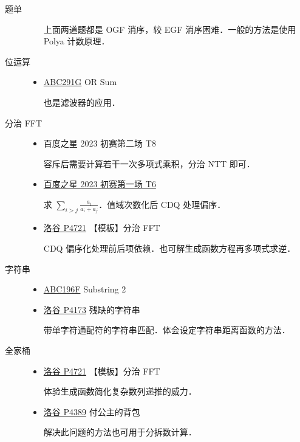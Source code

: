 \documentclass[fontset=fandol]{ctexbeamer}
\newcommand{\myemph}[1]{{\usebeamercolor[fg]{structure} #1}}
\begin{document}
\begin{frame}[allowframebreaks]{题单}
\begin{description}
\begin{itemize}
        上面两道题都是 OGF 消序，较 EGF 消序困难．一般的方法是使用 Polya 计数原理．
    \end{itemize}
    \item[位运算] \begin{itemize}
        \item \href{https://atcoder.jp/contests/abc291/tasks/abc291_g}{ABC291G} OR Sum

        也是滤波器的应用．
    \end{itemize}
    \item[分治 FFT] \begin{itemize}
        \item \myemph{百度之星 2023 初赛第二场 T8}

        容斥后需要计算若干一次多项式乘积，分治 NTT 即可．
    
        \item \href{https://www.bilibili.com/video/BV1p14y1z7sF}{百度之星 2023 初赛第一场 T6}

        求 $\sum_{i>j} \frac{a_i}{a_i + a_j}$．值域次数化后 CDQ 处理偏序．
    
        \item \href{https://www.luogu.com.cn/problem/P4721}{洛谷 P4721} 【模板】分治 FFT

        CDQ 偏序化处理前后项依赖．也可解生成函数方程再多项式求逆．
    \end{itemize}
    \item[字符串] \begin{itemize}
        \item \href{https://atcoder.jp/contests/abc196/tasks/abc196_f}{ABC196F} Substring 2
        \item \href{https://www.luogu.com.cn/problem/P4173}{洛谷 P4173} 残缺的字符串

        带单字符通配符的字符串匹配．体会设定字符串距离函数的方法．
    \end{itemize}
    \item[全家桶] \begin{itemize}
        \item \href{https://www.luogu.com.cn/problem/P4721}{洛谷 P4721} 【模板】分治 FFT

        体验生成函数简化复杂数列递推的威力．
        
        \item \href{https://www.luogu.com.cn/problem/P4389}{洛谷 P4389} 付公主的背包

        解决此问题的方法也可用于分拆数计算．


\end{itemize}
\end{description}
\end{frame}
\end{document}
